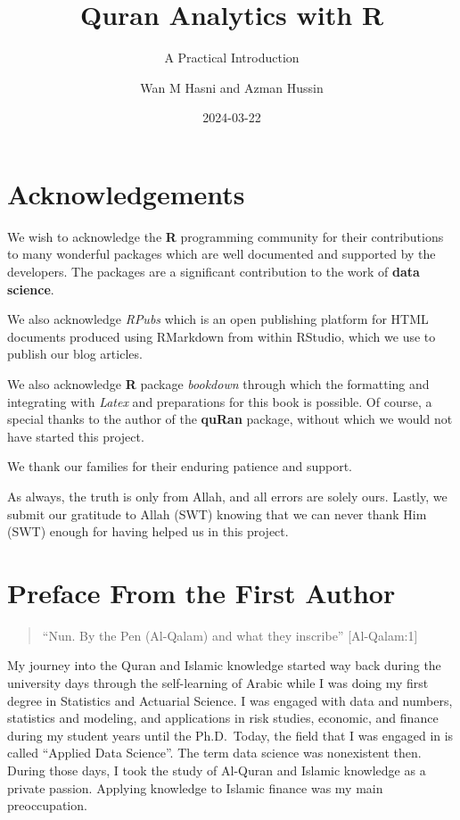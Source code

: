 \documentclass[
]{article}
\title{Quran Analytics with R}
\subtitle{A Practical Introduction}
\author{Wan M Hasni and Azman Hussin}
\date{2024-03-22}
\begin{document}
\maketitle

{
\setcounter{tocdepth}{2}
\tableofcontents
}
\hypertarget{acknowledgements}{%
\section*{Acknowledgements}\label{acknowledgements}}

We wish to acknowledge the \textbf{R} programming community for their contributions to many wonderful packages which are well documented and supported by the developers. The packages are a significant contribution to the work of \textbf{data science}.

We also acknowledge \emph{RPubs} which is an open publishing platform for HTML documents produced using RMarkdown from within RStudio, which we use to publish our blog articles.

We also acknowledge \textbf{R} package \emph{bookdown} through which the formatting and integrating with \emph{Latex} and preparations for this book is possible. Of course, a special thanks to the author of the \textbf{quRan} package, without which we would not have started this project.

We thank our families for their enduring patience and support.

As always, the truth is only from Allah, and all errors are solely ours. Lastly, we submit our gratitude to Allah (SWT) knowing that we can never thank Him (SWT) enough for having helped us in this project.

\hypertarget{preface-from-the-first-author}{%
\section*{Preface From the First Author}\label{preface-from-the-first-author}}

\begin{quote}
``Nun. By the Pen (Al-Qalam) and what they inscribe'' {[}Al-Qalam:1{]}
\end{quote}

My journey into the Quran and Islamic knowledge started way back during the university days through the self-learning of Arabic while I was doing my first degree in Statistics and Actuarial Science. I was engaged with data and numbers, statistics and modeling, and applications in risk studies, economic, and finance during my student years until the Ph.D.~Today, the field that I was engaged in is called ``Applied Data Science''. The term data science was nonexistent then. During those days, I took the study of Al-Quran and Islamic knowledge as a private passion. Applying knowledge to Islamic finance was my main preoccupation.
\end{document}
